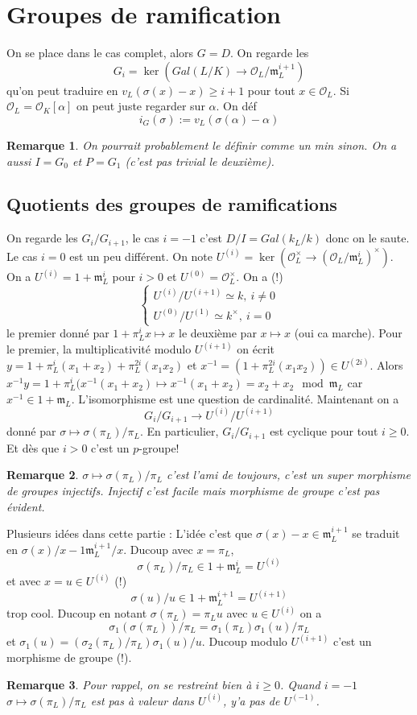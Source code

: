 \documentclass[a4paper,12pt]{book}
\newcommand{\Or}{\mathcal{O}}
\newcommand{\m}{\mathfrak m}
\theoremstyle{plain}
\newtheorem{rem}{Remarque}
\theoremstyle{definition}
\theoremstyle{remark}
\begin{document}
\section{Groupes de ramification}
On se place dans le cas complet, alors $G=D$.
On regarde les 
\[G_i=\ker(Gal(L/K)\to \Or_L/\m_L^{i+1})\]
qu'on peut traduire en $v_L(\sigma(x)-x)\geq i+1$ pour tout 
$x\in \Or_L$. Si $\Or_L=\Or_K[\alpha]$ on peut juste regarder
sur $\alpha$. On déf \[i_G(\sigma):=v_L(\sigma(\alpha)-\alpha)\]
\begin{rem}
    On pourrait probablement le définir comme un min sinon.
    On a aussi $I=G_0$ et $P=G_1$ (c'est pas trivial le deuxième).
\end{rem}

\subsection{Quotients des groupes de ramifications}
On regarde les $G_i/G_{i+1}$, le cas $i=-1$ c'est $D/I=Gal(k_L/k)$
donc on le saute. Le cas $i=0$ est un peu différent. On note
$U^{(i)}=\ker(\Or_L^\times\to (\Or_L/\m_L^i)^\times)$. On a
$U^{(i)}=1+\m_L^i$ pour $i>0$ et $U^{(0)}=\Or_L^\times$. On a (!)
\[\begin{cases}
    U^{(i)}/U^{(i+1)}\simeq k,~i\ne 0\\
    U^{(0)}/U^{(1)}\simeq k^\times,~i=0
\end{cases}\]
le premier donné par $1+\pi_L^ix\mapsto x$ le deuxième par
$x\mapsto x$ (oui ca marche). Pour le premier, la multiplicativité
modulo $U^{(i+1)}$ on écrit 
$y=1+\pi_L^i(x_1+x_2)+\pi_L^{2i}(x_1x_2)$ et 
$x^{-1}=(1+\pi_L^{2i}(x_1x_2))\in U^{(2i)}$. Alors $x^{-1}y=1+
\pi_L^i(x^{-1}(x_1+x_2)\mapsto x^{-1}(x_1+x_2)=x_2+x_2\mod\m_L$
car $x^{-1}\in 1+\m_L$. L'isomorphisme est une question
de cardinalité. Maintenant on a 
\[G_{i}/G_{i+1}\to U^{(i)}/U^{(i+1)}\]
donné par $\sigma \mapsto \sigma(\pi_L)/\pi_L$. En particulier,
$G_{i}/G_{i+1}$ est cyclique pour tout $i\geq 0$. Et dès que
$i>0$ c'est un $p$-groupe! 
\begin{rem}
    $\sigma\mapsto \sigma(\pi_L)/\pi_L$ c'est l'ami de toujours,
    c'est un super morphisme de groupes injectifs. Injectif c'est
    facile mais morphisme de groupe c'est pas évident.
\end{rem}
Plusieurs idées dans cette partie : L'idée c'est que 
$\sigma(x)-x\in \m_L^{i+1}$ se traduit en 
$\sigma(x)/x-1\m_L^{i+1}/x$. Ducoup avec $x=\pi_L$, 
\[\sigma(\pi_L)/\pi_L\in 1+\m_L^i=U^{(i)}\]
et avec $x=u\in U^{(i)}$ (!)
\[\sigma(u)/u\in 1+\m_L^{i+1}=U^{(i+1)}\]
trop cool. Ducoup en notant $\sigma(\pi_L)=\pi_Lu$ avec 
$u\in U^{(i)}$ on a 
\[\sigma_1(\sigma(\pi_L))/\pi_L=\sigma_1(\pi_L)\sigma_1(u)/\pi_L\]
et $\sigma_1(u)=(\sigma_2(\pi_L)/\pi_L)\sigma_1(u)/u$. Ducoup 
modulo $U^{(i+1)}$ c'est un morphisme de groupe (!).

\begin{rem}
    Pour rappel, on se restreint bien à $i\geq 0$. Quand $i=-1$
    $\sigma\mapsto \sigma(\pi_L)/\pi_L$ est pas à valeur dans
    $U^{(i)}$, y'a pas de $U^{(-1)}$.
\end{rem}
\end{document}
